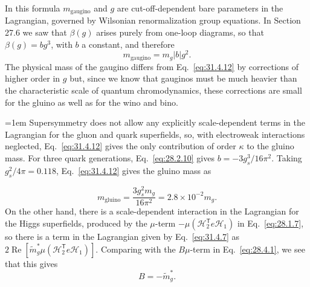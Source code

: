 In this formula \(m_{\mathrm{gaugino}}\) and \(g\) are cut-off-dependent
bare parameters in the Lagrangian, governed by Wilsonian renormalization
group equations. In Section 27.6 we saw that \(\beta(g)\) arises purely
from one-loop diagrams, so that \(\beta(g)=bg^3\), with \(b\) a constant,
and therefore
\begin{equation}
  m_{\mathrm{gaugino}}=m_g|b|g^2.
  \tag{31.4.12}\label{eq:31.4.12}
\end{equation}
The physical mass of the gaugino differs from Eq.~\eqref{eq:31.4.12} by
corrections of higher order in \(g\) but, since we know that gauginos must
be much heavier than the characteristic scale of quantum chromodynamics,
these corrections are small for the gluino as well as for the wino and
bino.

\begingroup
\emergencystretch=1em
Supersymmetry does not allow any explicitly scale-dependent terms in the
Lagrangian for the gluon and quark superfields, so, with electroweak
interactions neglected, Eq.~\eqref{eq:31.4.12} gives the only contribution
of order \(\kappa\) to the gluino mass. For three quark generations,
Eq.~\eqref{eq:28.2.10} gives \(b=-3g_s^3/16\pi^2\). Taking
\(g_s^2/4\pi=0.118\), Eq.~\eqref{eq:31.4.12} gives the gluino mass as
\par
\endgroup
\begin{equation}
  m_{\mathrm{gluino}}
  =\frac{3g_s^2m_g}{16\pi^2}
  =2.8\times10^{-2}m_g.
  \tag{31.4.13}\label{eq:31.4.13}
\end{equation}
On the other hand, there is a scale-dependent interaction in the
Lagrangian for the Higgs superfields, produced by the \(\mu\)-term
\(-\mu(\mathcal H_2^{\mathsf T}e\mathcal H_1)\) in
Eq.~\eqref{eq:28.1.7}, so there is a term in the Lagrangian given by
Eq.~\eqref{eq:31.4.7} as
\(2\operatorname{Re}
[\widetilde m_g^*\mu(\mathcal H_2^{\mathsf T}e\mathcal H_1)]\).
Comparing with the \(B\mu\)-term in Eq.~\eqref{eq:28.4.1}, we see that
this gives
\begin{equation}
  B=-\widetilde m_g^*.
  \tag{31.4.14}\label{eq:31.4.14}
\end{equation}

